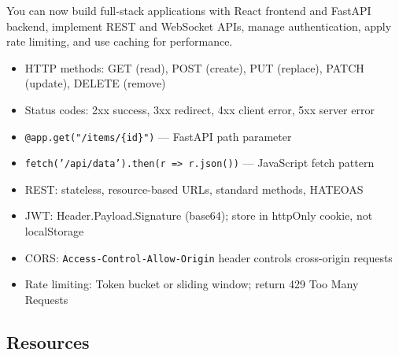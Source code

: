 \documentclass[11pt, a4paper, oneside]{report}
\begin{document}
\begin{microcheckpoint}
You can now build full-stack applications with React frontend and FastAPI backend, implement REST and WebSocket APIs, manage authentication, apply rate limiting, and use caching for performance.
\end{microcheckpoint}

\begin{cheatsheetbox}
\begin{itemize}[leftmargin=*]
\item HTTP methods: GET (read), POST (create), PUT (replace), PATCH (update), DELETE (remove)
\item Status codes: 2xx success, 3xx redirect, 4xx client error, 5xx server error
\item \texttt{@app.get("/items/\{id\}")} --- FastAPI path parameter
\item \texttt{fetch('/api/data').then(r => r.json())} --- JavaScript fetch pattern
\item REST: stateless, resource-based URLs, standard methods, HATEOAS
\item JWT: Header.Payload.Signature (base64); store in httpOnly cookie, not localStorage
\item CORS: \texttt{Access-Control-Allow-Origin} header controls cross-origin requests
\item Rate limiting: Token bucket or sliding window; return 429 Too Many Requests
\end{itemize}
\end{cheatsheetbox}

\subsection*{Resources}
\end{document}
